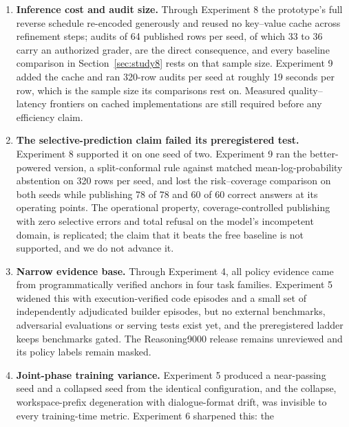 \documentclass[10pt,a4paper]{article}
\begin{document}
\begin{enumerate}[label=\arabic*.]
  one effective threshold in six successive runs. Experiment 8 de-correlated the
  failure events and replaced the triple sweep with a single scalar rule, and
  the fitted thresholds were non-degenerate on both seeds for the first time.
  The residual limitation is that the heads still share a trunk and are still
  supervised by graders in four narrow families, so correlated blind spots
  remain untested.
\item \textbf{Inference cost and audit size.} Through Experiment 8 the prototype's
  full reverse schedule re-encoded generously and reused no key--value cache
  across refinement steps; audits of 64 published rows per seed, of which 33
  to 36 carry an authorized grader, are the direct consequence, and every
  baseline comparison in Section~\ref{sec:study8} rests on that sample size.
  Experiment 9 added the cache and ran 320-row audits per seed at roughly 19
  seconds per row, which is the sample size its comparisons rest on. Measured
  quality--latency frontiers on cached implementations are still required
  before any efficiency claim.
\item \textbf{The selective-prediction claim failed its preregistered test.}
  Experiment 8 supported it on one seed of two. Experiment 9 ran the better-powered
  version, a split-conformal rule against matched mean-log-probability
  abstention on 320 rows per seed, and lost the risk--coverage comparison on
  both seeds while publishing 78 of 78 and 60 of 60 correct answers at its
  operating points. The operational property, coverage-controlled publishing
  with zero selective errors and total refusal on the model's incompetent
  domain, is replicated; the claim that it beats the free baseline is not
  supported, and we do not advance it.
\item \textbf{Narrow evidence base.} Through Experiment 4, all policy evidence came
  from programmatically verified anchors in four task families. Experiment 5
  widened this with execution-verified code episodes and a small set of
  independently adjudicated builder episodes, but no external benchmarks,
  adversarial evaluations or serving tests exist yet, and the preregistered
  ladder keeps benchmarks gated. The Reasoning9000 release remains unreviewed
  and its policy labels remain masked.
\item \textbf{Joint-phase training variance.} Experiment 5 produced a near-passing
  seed and a collapsed seed from the identical configuration, and the
  collapse, workspace-prefix degeneration with dialogue-format drift, was
  invisible to every training-time metric. Experiment 6 sharpened this: the

\end{enumerate}
\end{document}
